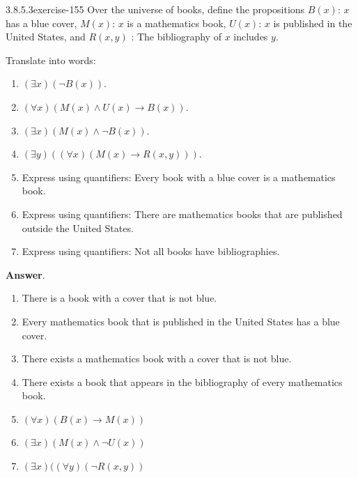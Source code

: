 \documentclass[twoside,10pt,]{book}
\numberwithin{equation}{section}
\begin{document}
\begin{divisionsolution}{3.8.5.3}{}{exercise-155}%
\hypertarget{p-1411}{}%
Over the universe of books, define the propositions \(B(x)\): \(x\) has a blue cover, \(M(x)\): \(x\) is a mathematics book, \(U(x)\): \(x\) is published in the United States, and \(R(x, y)\) : The bibliography of \(x\) includes \(y\).%
\par
\hypertarget{p-1412}{}%
Translate into words:%
\par
\hypertarget{p-1413}{}%
\leavevmode%
\begin{enumerate}[label=(\alph*)]
\item\hypertarget{li-776}{}\hypertarget{p-1414}{}%
\((\exists x)(\neg B(x))\).%
\item\hypertarget{li-777}{}\hypertarget{p-1415}{}%
\((\forall x)(M(x) \land  U(x) \rightarrow  B(x))\).%
\item\hypertarget{li-778}{}\hypertarget{p-1416}{}%
\((\exists x)(M(x) \land  \neg B(x))\).%
\item\hypertarget{li-779}{}\hypertarget{p-1417}{}%
\((\exists y)((\forall x)(M(x)\to R(x,y)))\).%
\item\hypertarget{li-780}{}\hypertarget{p-1418}{}%
Express using quantifiers: Every book with a blue cover is a mathematics book.%
\item\hypertarget{li-781}{}\hypertarget{p-1419}{}%
Express using quantifiers: There are mathematics books that are published outside the United States.%
\item\hypertarget{li-782}{}\hypertarget{p-1420}{}%
Express using quantifiers: Not all books have bibliographies.%
\end{enumerate}
%
\par\smallskip%
\noindent\textbf{Answer}.\quad%
\hypertarget{p-1421}{}%
\leavevmode%
\begin{enumerate}[label=(\alph*)]
\item\hypertarget{li-783}{}There is a book with a cover that is not blue.%
\item\hypertarget{li-784}{}\hypertarget{p-1422}{}%
Every mathematics book that is published in the United States has a blue cover.%
\item\hypertarget{li-785}{}\hypertarget{p-1423}{}%
There exists a mathematics book with a cover that is not blue.%
\item\hypertarget{li-786}{}\hypertarget{p-1424}{}%
There exists a book that appears in the bibliography of every mathematics book.%
\item\hypertarget{li-787}{}\hypertarget{p-1425}{}%
\((\forall x)(B(x)\to M(x))\)%
\item\hypertarget{li-788}{}\hypertarget{p-1426}{}%
\((\exists x)(M(x)\land \neg U(x))\)%
\item\hypertarget{li-789}{}\hypertarget{p-1427}{}%
\((\exists x)((\forall y)(\neg R(x,y))\)%
\end{enumerate}
%
\end{divisionsolution}%
\end{document}
